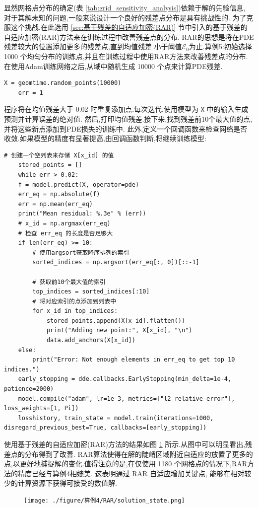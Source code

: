 \documentclass{Sichuan Normal University}
\begin{document}
显然网格点分布的确定(表 \ref{tab:grid_sensitivity_analysis})依赖于解的先验信息,
对于其解未知的问题,一般来说设计一个良好的残差点分布是具有挑战性的.
为了克服这个挑战,在此选用 \ref{sec:基于残差的自适应加密(RAR)} 节中引入的基于残差的自适应加密(RAR)方法\cite{luDeepXDEDeepLearning2021}来在训练过程中改善残差点的分布.
RAR的思想是将在PDE残差较大的位置添加更多的残差点,直到均值残差
小于阈值$\mathcal{E}_0$为止.算例5:初始选择 1000 个均匀分布的训练点,并且在训练过程中使用RAR方法来改善残差点的分布.
在使用Adam训练网络之后,从域中随机生成 10000 个点来计算PDE残差.
\begin{lstlisting}[style=python,basicstyle=\footnotesize\fontspec{Courier New},]  
    X = geomtime.random_points(10000)
    err = 1    
\end{lstlisting}
程序将在均值残差大于 0.02 时重复添加点.每次迭代,使用模型为 \texttt{X} 中的输入生成预测并计算误差的绝对值.
然后,打印均值残差.接下来,找到残差前10个最大值的点,并将这些新点添加到PDE损失的训练中.
此外,定义一个回调函数来检查网络是否收敛.如果模型的精度有显著提高,由回调函数判断,将继续训练模型:
\begin{lstlisting}[style=python,basicstyle=\footnotesize\fontspec{Courier New},]  
    # 创建一个空列表来存储 X[x_id] 的值
    stored_points = []
    while err > 0.02:
    f = model.predict(X, operator=pde)
    err_eq = np.absolute(f)
    err = np.mean(err_eq)
    print("Mean residual: %.3e" % (err))
    # x_id = np.argmax(err_eq)
    # 检查 err_eq 的长度是否足够大
    if len(err_eq) >= 10:
        # 使用argsort获取降序排列的索引
        sorted_indices = np.argsort(err_eq[:, 0])[::-1]

        # 获取前10个最大值的索引
        top_indices = sorted_indices[:10]
        # 将对应索引的点添加到列表中
        for x_id in top_indices:
            stored_points.append(X[x_id].flatten())
            print("Adding new point:", X[x_id], "\n")
            data.add_anchors(X[x_id])
    else:
        print("Error: Not enough elements in err_eq to get top 10 indices.")
    early_stopping = dde.callbacks.EarlyStopping(min_delta=1e-4, patience=2000)
    model.compile("adam", lr=1e-3, metrics=["l2 relative error"], loss_weights=[1, Pi])
    losshistory, train_state = model.train(iterations=1000, disregard_previous_best=True, callbacks=[early_stopping])
\end{lstlisting}
使用基于残差的自适应加密(RAR)方法的结果如图 \ref{fig:RAR网格点分布图} 所示.从图中可以明显看出,残差点的分布得到了改善.
RAR算法使得在解的陡峭区域附近自适应的放置了更多的点,以更好地捕捉解的变化.值得注意的是,在仅使用 1180 个网格点的情况下,RAR方法的精度已经与算例4相媲美.
这表明通过 RAR 自适应增加关键点, 能够在相对较少的计算资源下获得可接受的数值解.
\begin{figure}[H]
    \centering
    \texttt{[image: ./figure/算例4/RAR/solution\_state.png]}
    \label{fig:RAR网格点分布图}
\end{figure}
\end{document}
